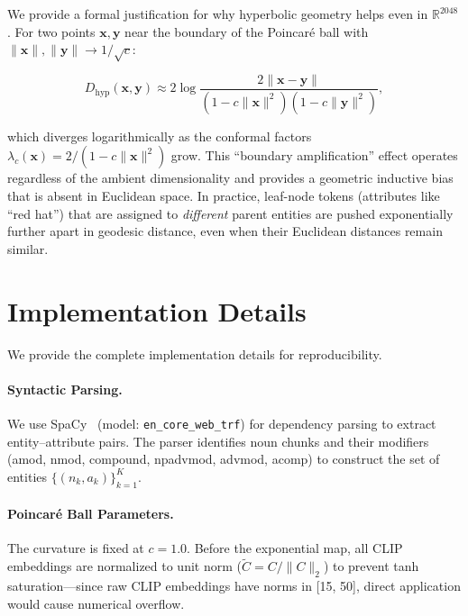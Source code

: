 \documentclass[sigconf,nonacm]{acmart}
\begin{document}
We provide a formal justification for why hyperbolic geometry helps even in $\mathbb{R}^{2048}$. For two points $\mathbf{x}, \mathbf{y}$ near the boundary of the Poincar\'e ball with $\|\mathbf{x}\|, \|\mathbf{y}\| \to 1/\sqrt{c}$:

\begin{equation}
D_{\text{hyp}}(\mathbf{x}, \mathbf{y}) \approx 2 \log \frac{2\|\mathbf{x} - \mathbf{y}\|}{(1 - c\|\mathbf{x}\|^2)(1 - c\|\mathbf{y}\|^2)},
\label{eq:boundary}
\end{equation}

which diverges logarithmically as the conformal factors $\lambda_c(\mathbf{x}) = 2/(1-c\|\mathbf{x}\|^2)$ grow. This ``boundary amplification'' effect operates regardless of the ambient dimensionality and provides a geometric inductive bias that is absent in Euclidean space. In practice, leaf-node tokens (attributes like ``red hat'') that are assigned to \emph{different} parent entities are pushed exponentially further apart in geodesic distance, even when their Euclidean distances remain similar.

\section{Implementation Details}
\label{sec:impl_details}

\setcounter{table}{0}

We provide the complete implementation details for reproducibility.

\paragraph{Syntactic Parsing.} We use SpaCy~\cite{honnibal2020spacy} (model: \texttt{en\_core\_web\_trf}) for dependency parsing to extract entity--attribute pairs. The parser identifies noun chunks and their modifiers (amod, nmod, compound, npadvmod, advmod, acomp) to construct the set of entities $\{(n_k, a_k)\}_{k=1}^K$.

\paragraph{Poincar\'e Ball Parameters.} The curvature is fixed at $c=1.0$. Before the exponential map, all CLIP embeddings are normalized to unit norm ($\tilde{C} = C / \|C\|_2$) to prevent tanh saturation---since raw CLIP embeddings have norms in [15, 50], direct application would cause numerical overflow.
\end{document}
